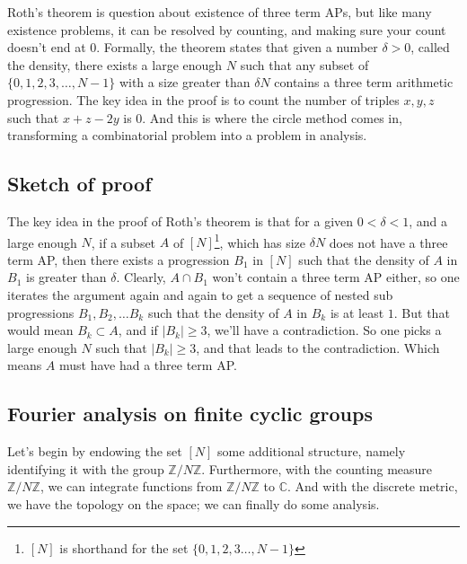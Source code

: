 \documentclass[12pt, titlepage]{article}
\theoremstyle{definition}
\newcommand{\znz}{\mathbb{Z}/N\mathbb{Z}}
\begin{document}
Roth's theorem is question about existence of three term APs, but like many existence problems, it can be resolved by counting, and making sure your count doesn't end at $0$. Formally, the theorem states that given a number $\delta > 0$, called the density, there exists a large enough $N$ such that any subset of $\{0,1, 2, 3, \ldots, N-1\}$ with a size greater than $\delta N$ contains a  three term arithmetic progression.  The key idea in the proof is to count the number of triples $x,y,z$ such that $x+z-2y$ is $0$. And this is where the circle method comes in, transforming a combinatorial problem into a problem in analysis.

\subsection{Sketch of proof}
The key idea in the proof of Roth's theorem is that for a given $0 < \delta < 1$, and a large enough $N$, if a subset $A$ of $[N]$\footnote{$[N]$ is shorthand for the set $\{0,1, 2,3 \ldots, N-1\}$}, which has size $\delta N$ does not have a three term AP, then there exists a progression $B_1$ in $[N]$ such that the density of $A$ in $B_1$ is greater than $\delta$. Clearly, $A \cap B_1$ won't contain a three term AP either, so one iterates the argument again and again to get a sequence of nested sub progressions $B_1, B_2, \ldots B_k$ such that the density of $A$ in $B_k$ is at least $1$. But that would mean $B_k \subset A$, and if $|B_k| \geq 3$, we'll have a contradiction. So one picks a large enough $N$ such that $|B_k| \geq 3$, and that leads to the contradiction. Which means $A$ must have had a three term AP.

\subsection{Fourier analysis on finite cyclic groups}
Let's begin by endowing the set $[N]$ some additional structure, namely identifying it with the group $\znz$. Furthermore, with the counting measure $\znz$, we can integrate functions from $\znz$ to $\mathbb{C}$. And with the discrete metric, we have the topology on the space; we can finally do some analysis.
\end{document}
